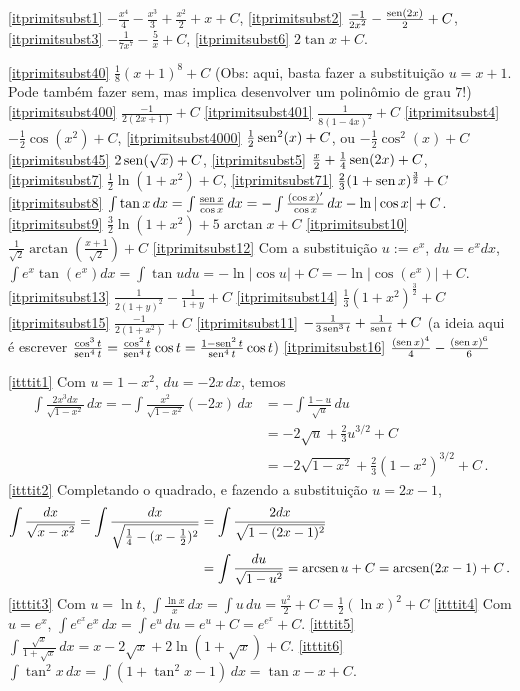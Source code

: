 \begin{Solution}{9.14}
\eqref{itprimitsubst1}
$-\frac{x^4}{4}-\frac{x^3}{3}+\frac{x^2}{2}+x+C$,
\eqref{itprimitsubst2} $\frac{-1}{2x^2}-\frac{\operatorname{sen} (2x)}{2}+C$,
\eqref{itprimitsubst3} $-\frac{1}{7x^7}-\frac{5}{x}+C$,
\eqref{itprimitsubst6} $2\tan x+C$.
\end{Solution}
\begin{Solution}{9.15}
\eqref{itprimitsubst40} $\frac{1}{8}(x+1)^8+C$ (Obs: aqui, basta fazer a
substituição $u=x+1$. Pode também fazer sem, mas implica desenvolver um
polinômio de grau $7$!)
\eqref{itprimitsubst400} $\frac{-1}{2(2x+1)}+C$
\eqref{itprimitsubst401} $\frac{1}{8(1-4x)^2}+C$
\eqref{itprimitsubst4} $-\frac{1}{2}\cos(x^2)+C$,
\eqref{itprimitsubst4000} $\frac{1}{2}\operatorname{sen}^2(x)+C$, ou $-\frac{1}{2}\cos^2(x)+C$
\eqref{itprimitsubst45} $2\operatorname{sen}(\sqrt{x})+C$,
\eqref{itprimitsubst5} $\frac{x}{2}+\tfrac14\operatorname{sen} (2x)+C$,
\eqref{itprimitsubst7} $\tfrac12\ln(1+x^2)+C$,
\eqref{itprimitsubst71} $\frac{2}{3}(1+\operatorname{sen} x)^{\frac{3}{2}}+C$
\eqref{itprimitsubst8} $\int \tan x\,dx=\int\frac{\operatorname{sen} x}{\cos
x}\,dx=-\int\frac{(\cos x)'}{\cos
x}\,dx -\ln|\cos x|+C$.
\eqref{itprimitsubst9} $\tfrac32 \ln(1+x^2)+5\arctan x+C$
\eqref{itprimitsubst10} $\frac{1}{\sqrt{2}}\arctan(\frac{x+1}{\sqrt{2}})+C$
\eqref{itprimitsubst12}
Com a substituição $u:=e^x$, $du=e^x dx$,
$\int e^x\tan(e^x)dx=\int \tan u du=-\ln|\cos u|+C=-\ln|\cos(e^x)|+C$.
\eqref{itprimitsubst13} $\frac{1}{2(1+y)^2}-\frac{1}{1+y}+C$
\eqref{itprimitsubst14} $\frac{1}{3}(1+x^2)^{\frac{3}{2}}+C$
\eqref{itprimitsubst15} $\frac{-1}{2(1+x^2)}+C$
\eqref{itprimitsubst11} $-\frac{1}{3\operatorname{sen}^3t}+\frac{1}{\operatorname{sen} t}+C$ (a ideia aqui
é escrever $\frac{\cos^3t}{\operatorname{sen}^4t}=\frac{\cos^2t}{\operatorname{sen}^4t}\cos
t=\frac{1-\operatorname{sen}^2t}{\operatorname{sen}^4t}\cos t$)
\eqref{itprimitsubst16} $\frac{(\operatorname{sen} x)^4}{4}-\frac{(\operatorname{sen} x)^6}{6}$
\end{Solution}
\begin{Solution}{9.16}
\eqref{itttit1}
Com $u=1-x^2$, $du=-2x\,dx$, temos
\begin{align*}
\int \frac{2x^3dx}{\sqrt{1-x^2}}\,dx=-\int
\frac{x^2}{\sqrt{1-x^2}}(-2x)\,dx
&=-\int \frac{1-u}{\sqrt{u}}\,du\\
&=-2\sqrt{u}+\tfrac23 u^{3/2}+C\\
&=-2\sqrt{1-x^2}+\tfrac23 (1-x^2)^{3/2}+C\,.
\end{align*}
\eqref{itttit2}
Completando o quadrado, e fazendo a substituição $u=2x-1$,
\begin{align*}
\int \frac{dx}{\sqrt{x-x^2}}=\int
\frac{dx}{\sqrt{\tfrac14-(x-\tfrac12)^2}}&=
\int \frac{2 dx}{\sqrt{1-(2x-1)^2}}\\
&=\int \frac{du}{\sqrt{1-u^2}}=\operatorname{arcsen} u+C=\operatorname{arcsen} (2x-1)+C\,.
\end{align*}
\eqref{itttit3} Com $u=\ln t$, $\int \frac{\ln x}{x}\,dx=\int
u\,du=\tfrac{u^2}{2}+C=\tfrac12(\ln x)^2+C$
\eqref{itttit4} Com $u=e^x$, $\int e^{e^x}e^x\,dx=\int e^u\,du=e^u+C=e^{e^x}+C$.
\eqref{itttit5} $\int \frac{\sqrt{x}}{1+\sqrt{x}}\,dx=x-2\sqrt{x}+2\ln
(1+\sqrt{x})+C$.
\eqref{itttit6} $\int \tan^2x\,dx=\int(1+\tan^2x-1)\,dx=\tan x-x+C$.
\end{Solution}

